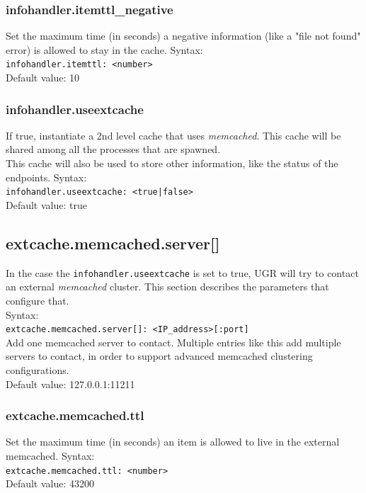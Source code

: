 \documentclass[12pt]{article} %
\begin{document}
\subsubsection{infohandler.itemttl\_negative}
Set the maximum time (in seconds) a negative information (like a "file not found" error) is allowed to stay in the cache.
Syntax:\\
\verb"infohandler.itemttl: <number>"\\
Default value: 10


\subsubsection{infohandler.useextcache}
If true, instantiate a 2nd level cache that uses \textit{memcached}. This cache will be shared among all the processes that are spawned.\\
This cache will also be used to store other information, like the status of the endpoints.
Syntax:\\
\verb"infohandler.useextcache: <true|false>"\\
Default value: true

\subsection{extcache.memcached.server[]}
In the case the \verb"infohandler.useextcache" is set to true, UGR will try to contact an external \textit{memcached} cluster.  This section describes the parameters that configure that.\\

 Syntax:\\

\verb"extcache.memcached.server[]: <IP_address>[:port]"\\

Add one memcached server to contact. Multiple entries like this add multiple servers to contact, in order to support advanced memcached clustering configurations.\\

Default value: 127.0.0.1:11211

\subsubsection{extcache.memcached.ttl}
Set the maximum time (in seconds) an item is allowed to live in the external memcached.
Syntax:\\
\verb"extcache.memcached.ttl: <number>"\\
Default value: 43200\\
\end{document}
